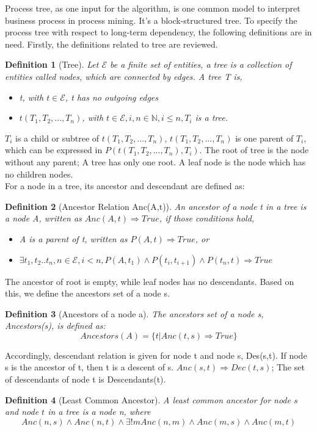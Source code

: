 \documentclass[]{article}
\newtheorem{mydef}{Definition}[section]
\begin{document}
Process tree, as one input for the algorithm, is one common model to interpret business process in process mining. It's a block-structured tree. To specify the process tree with respect to long-term dependency, the following definitions are in need. Firstly, the definitions related to tree are reviewed.
\begin{mydef}[Tree]
	Let $ \mathscr{E} $ be a finite set of entities, a tree is a collection of entities called nodes, which are connected by edges. A tree T is,
	
\begin{itemize}
	\item t, with  $t\in \mathscr{E}$, t has no outgoing edges
	\item $t(T_1,T_2,...,T_n)$, with $t\in \mathscr{E}, i,n\in \mathbb{N}, i \leq n ,T_i$ is a tree.
\end{itemize}
\end{mydef}
$T_i$ is a child or subtree of $t(T_1,T_2,...,T_n)$, $t(T_1,T_2,...,T_n)$ is one parent of $T_i$, which can be expressed in $P(t(T_1,T_2,...,T_n),T_i)$. The root of tree is the node without any parent; A tree has only one root. A leaf node is the node which has no children nodes.\\
For a node in a tree, its ancestor and descendant are defined as:
\begin{mydef}[Ancestor Relation Anc(A,t)]
	An ancestor of a node t in a tree is a node A, written as $ Anc(A,t) \Rightarrow True$, if those conditions hold,  
	\begin{itemize}
	\item A is a parent of t, written as $ P(A,t) \Rightarrow True$, or
	\item $\exists t_1,t_2..t_n,n\in \mathscr{E}, i < n, P(A,t_1)\land P(t_i,t_{i+1}) \land P(t_n,t) \Rightarrow True $
   \end{itemize}
\end{mydef}
The ancestor of root is empty, while leaf nodes has no descendants. Based on this, we define the ancestors set of a node s. 
\begin{mydef}[Ancestors of a node a]
	The ancestors set of a node s, Ancestors(s), is defined as: \[ Ancestors(A)=\{t|Anc(t,s) \Rightarrow True \} \]
\end{mydef}
Accordingly, descendant relation is given for node t and node s, Des(s,t). If node s is the ancestor of t, then t is a descent of s. $Anc(s,t) \Rightarrow Dec(t,s)$; The set of descendants of node t is Descendants(t).
\begin{mydef}[Least Common Ancestor]
	A least common ancestor for node $s$ and node $t$ in a tree is a node n, where 
	\[Anc(n,s) \land Anc(n,t) \land \exists! m Anc(n,m) \land Anc(m,s) \land Anc(m,t) \]
\end{mydef}
\end{document}
